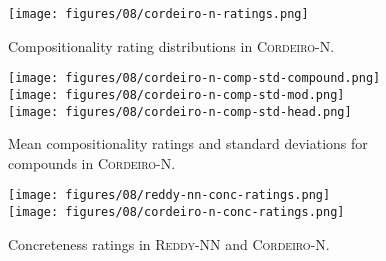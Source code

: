 \documentclass[output=paper,colorlinks,citecolor=brown]{langscibook}
\begin{document}

\begin{figure}[H]
    \centering
    \texttt{[image: figures/08/cordeiro-n-ratings.png]}
    \caption{Compositionality rating distributions in \textsc{Cordeiro-N}.}
    \label{fig:cordeiro-n}
\end{figure}\pagebreak
\vfill
\begin{figure}[H]
    \texttt{[image: figures/08/cordeiro-n-comp-std-compound.png]}\\
    \texttt{[image: figures/08/cordeiro-n-comp-std-mod.png]}\\
    \texttt{[image: figures/08/cordeiro-n-comp-std-head.png]}
    \caption{Mean compositionality ratings and standard deviations for compounds in \textsc{Cordeiro-N}.}
    \label{fig:cordeiro-n-std}
\end{figure}
\vfill
\pagebreak


\begin{figure}[H]
    \centering
    \texttt{[image: figures/08/reddy-nn-conc-ratings.png]}\\
    \texttt{[image: figures/08/cordeiro-n-conc-ratings.png]}
    \caption{Concreteness ratings in \textsc{Reddy-NN} and \textsc{Cordeiro-N}.}
    \label{fig:reddy-cordeiro-conc}
\end{figure}


{\sloppy\printbibliography[heading=subbibliography,notkeyword=this]}
\end{document}
